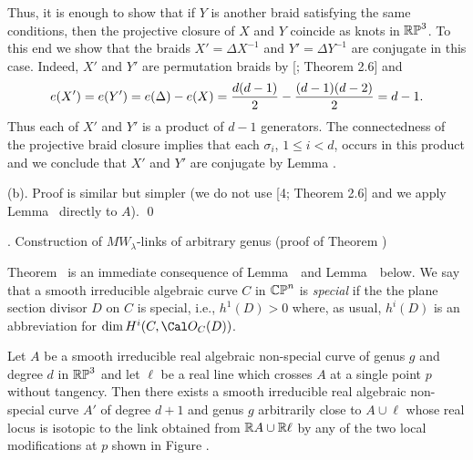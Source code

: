 Thus, it is enough to show that if $Y$ is another braid satisfying the same conditions, then
the projective closure of $X$ and $Y$ coincide as knots in $\Bbb{RP}^3$.
To this end we show that the braids $X'=\Delta X^{-1}$ and $Y'=\Delta Y^{-1}$ are conjugate in this case.
Indeed, $X'$ and $Y'$ are permutation braids by [; Theorem 2.6] and
$$
    e(X')=e(Y')=e(\Delta)-e(X)={d(d-1)\over 2} - {(d-1)(d-2)\over 2} = d-1.
$$
Thus each of $X'$ and $Y'$ is a product of $d-1$ generators.
The connectedness of the projective braid closure implies that
each $\sigma_i$, $1\le i<d$, occurs in this product and we conclude
that $X'$ and $Y'$ are conjugate by Lemma \lemCoxeter.

\smallskip
(b). Proof is similar but simpler (we do not use [4; Theorem 2.6] and we apply Lemma \lemCoxeter\
directly to $A$).
\qed\enddemo







\head\sectExist. Construction of $MW_\lambda$-links of arbitrary genus (proof of Theorem \thExist)
\endhead

Theorem \thExist\ is an immediate consequence of Lemma~\lemExistOne\ and Lemma~\lemExistTwo\ below.
%
We say that a smooth irreducible algebraic curve $C$ in $\Bbb{CP}^n$ is {\it special} if the
the plane section divisor $D$ on $C$ is special, i.e., $h^1(D)>0$ where, as usual, $h^i(D)$ is an
abbreviation for $\dim H^i(C,\Cal O_C(D))$.

Let $A$ be a smooth irreducible real algebraic non-special curve of genus $g$ and degree $d$ %
in $\Bbb{RP}^3$
and let $\ell$ be a real line which crosses $A$ at a single point $p$ without tangency.
Then there exists a smooth irreducible real algebraic non-special curve $A'$ of degree $d+1$ and genus $g$
arbitrarily close to $A\cup\ell$ whose real locus is isotopic to the link obtained
from $\Bbb R A\cup\Bbb R\ell$ by any of the two local modifications at $p$ shown in Figure \figSmoo.

